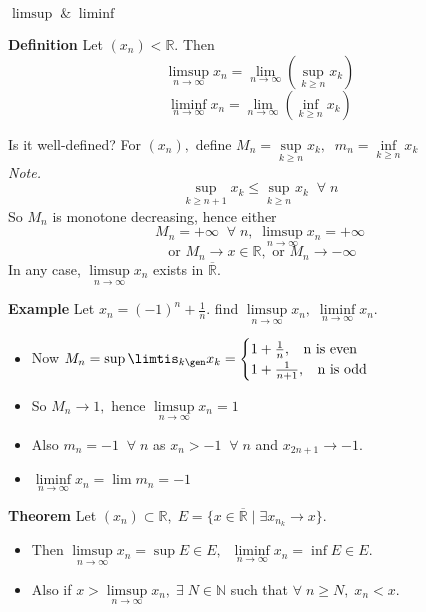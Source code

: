 \documentclass[12pt]{article}
\begin{document}
\begin{section}{\bf $\limsup\;\&\;\liminf$}

{\bf Definition} Let $(x_n)<\mathbb{R}$. Then $$\limsup\limits_{n\to\infty} x_n = \lim\limits_{n\to\infty}(\sup\limits_{k\ge n} x_k)$$
    $$\liminf\limits_{n\to\infty} x_n = \lim\limits_{n\to\infty}(\inf\limits_{k\ge n} x_k)$$
    
    Is it well-defined?    For $(x_n),$ define $M_n=\sup\limits_{k\ge n} x_k,\;\; m_n = \inf\limits_{k\ge n} x_k$\\
    
    {\sl Note.}
    $$\sup\limits_{k\ge n+1} x_k \le \sup\limits_{k\ge n} x_k\;\;\forall\; n$$
    So $M_n$ is monotone decreasing, hence either $$M_n=+\infty\;\;\forall\;n,\;\limsup\limits_{n\to\infty} x_n = +\infty$$
    $$\text{ or } M_n\to x\in\mathbb{R}, \text{ or } M_n\to -\infty$$
    In any case, $\limsup\limits_{n\to\infty} x_n  $ exists in $\overline{\mathbb{R}}$.
    
    \vspace{1\baselineskip}
    {\bf Example} Let $x_n=(-1)^n +\frac{1}{n}.$ find $\limsup\limits_{n\to\infty} x_n,\; \liminf\limits_{n\to\infty} x_n$.
    \begin{itemize}
        \item Now $M_n = \sup\limtis_{k\gen} x_k = \begin{cases}
        1+\frac{1}{n},\;\; \text{ n is even}\\
        1+\frac{1}{n+1},\;\;\text{ n is odd }\end{cases}$
        \item So $M_n\to 1,$ hence $\limsup\limits_{n\to\infty} x_n = 1$
        \item Also $m_n = -1\;\;\forall\;n$ as $x_n > -1\;\;\forall\;n$ and $x_{2n+1}\to -1$.
        \item $\liminf\limits_{n\to\infty} x_n =\lim m_n = -1$
    \end{itemize}
    
    \vspace{1\baselineskip}
    {\bf Theorem} Let $(x_n)\subset \mathbb{R},\; E=\{x\in\overline{\mathbb{R}}\;|\;\exists x_{n_k} \to x\}$.
    \begin{itemize}
        \item Then $\limsup\limits_{n\to\infty} x_n = \sup E\in E,\;\; \liminf\limits_{n\to\infty} x_n =\inf E\in E$.
        \item Also if $x> \limsup\limits_{n\to\infty} x_n,\;\exists\; N\in\mathbb{N}$ such that $\forall\; n\ge N,\; x_n<x$.
    \end{itemize}
    

\end{section}
\end{document}
